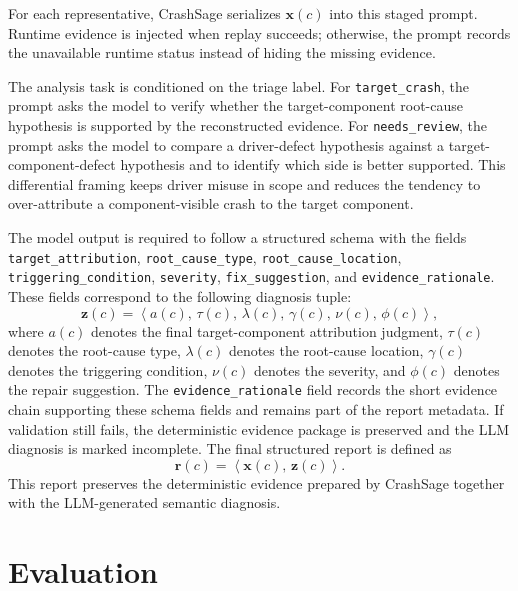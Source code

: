 \documentclass[pdflatex,sn-basic]{sn-jnl}%
\theoremstyle{thmstyleone}%
\theoremstyle{thmstyletwo}%
\theoremstyle{thmstylethree}%
\begin{document}
For each representative, CrashSage serializes \(\mathbf{x}(c)\) into this staged prompt.
Runtime evidence is injected when replay succeeds; otherwise, the prompt records the unavailable runtime status instead of hiding the missing evidence.

The analysis task is conditioned on the triage label.
For \texttt{target\_crash}, the prompt asks the model to verify whether the target-component root-cause hypothesis is supported by the reconstructed evidence.
For \texttt{needs\_review}, the prompt asks the model to compare a driver-defect hypothesis against a target-component-defect hypothesis and to identify which side is better supported.
This differential framing keeps driver misuse in scope and reduces the tendency to over-attribute a component-visible crash to the target component.

The model output is required to follow a structured schema with the fields \texttt{target\_attribution}, \texttt{root\_cause\_type}, \texttt{root\_cause\_location}, \texttt{triggering\_condition}, \texttt{severity}, \texttt{fix\_suggestion}, and \texttt{evidence\_rationale}.
These fields correspond to the following diagnosis tuple:
\begin{equation}
\mathbf{z}(c)=
\left\langle
a(c),\,\tau(c),\,\lambda(c),\,\gamma(c),\,\nu(c),\,\phi(c)
\right\rangle ,
\end{equation}
where \(a(c)\) denotes the final target-component attribution judgment, \(\tau(c)\) denotes the root-cause type, \(\lambda(c)\) denotes the root-cause location, \(\gamma(c)\) denotes the triggering condition, \(\nu(c)\) denotes the severity, and \(\phi(c)\) denotes the repair suggestion.
The \texttt{evidence\_rationale} field records the short evidence chain supporting these schema fields and remains part of the report metadata.
If validation still fails, the deterministic evidence package is preserved and the LLM diagnosis is marked incomplete.
The final structured report is defined as
\begin{equation}
\mathbf{r}(c)=
\left\langle
\mathbf{x}(c),\,\mathbf{z}(c)
\right\rangle .
\end{equation}
This report preserves the deterministic evidence prepared by CrashSage together with the LLM-generated semantic diagnosis.



\section{Evaluation}
\label{sec:evaluation}
\end{document}
